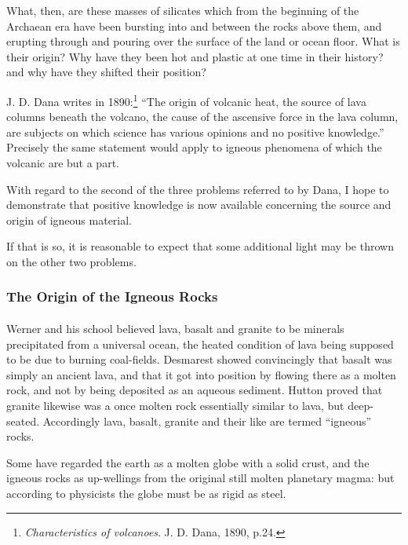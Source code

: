 \documentclass[a4paper, 12pt, oneside, landscape]{article}
\begin{document}
What, then, are these masses of silicates which from the beginning of the Archaean era have been bursting into and between the rocks above them, and erupting through and pouring over the surface of the land or ocean floor. What is their origin? Why have they been hot and plastic at one time in their history? and why have they shifted their position?

J. D. Dana writes in 1890:\footnote{\emph{Characteristics of volcanoes}. J. D. Dana, 1890, p.24.} ``The origin of volcanic heat, the source of lava columns beneath the volcano, the cause of the ascensive force in the lava column, are subjects on which science has various opinions and no positive knowledge.'' Precisely the same statement would apply to igneous phenomena of which the volcanic are but a part.

With regard to the second of the three problems referred to by Dana, I hope to demonstrate that positive knowledge is now available concerning the source and origin of igneous material.

If that is so, it is reasonable to expect that some additional light may be thrown on the other two problems.

\subsubsection{The Origin of the Igneous Rocks}
\paragraph{}
Werner and his school believed lava, basalt and granite to be minerals precipitated from a universal ocean, the heated condition of lava being supposed to be due to burning coal-fields. Desmarest showed convincingly that basalt was simply an ancient lava, and that it got into position by flowing there as a molten rock, and not by being deposited as an aqueous sediment. Hutton proved that granite likewise was a once molten rock essentially similar to lava, but deep-seated. Accordingly lava, basalt, granite and their like are termed ``igneous'' rocks.

Some have regarded the earth as a molten globe with a solid crust, and the igneous rocks as up-wellings from the original still molten planetary magma: but according to physicists the globe must be as rigid as steel.
\end{document}
